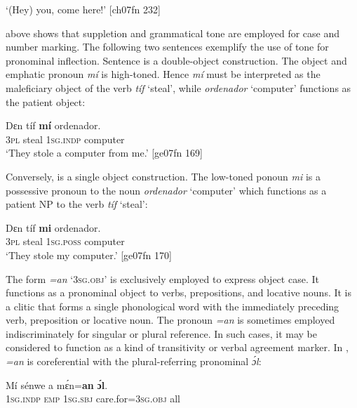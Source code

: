 \glt ‘(Hey) you, come here!’ [ch07fn 232]
\z

 above shows that suppletion and grammatical tone are employed for case and number marking. The following two sentences exemplify the use of tone for pronominal inflection. Sentence  is a double-object construction. The object and emphatic pronoun \textit{mí} is high-toned. Hence \textit{mí} must be interpreted as the maleficiary object of the verb \textit{tíf} ‘steal’, while \textit{ordenador} ‘computer’ functions as the patient object:


\ea%
    \label{ex:key:284}
    \gll Dɛn  tíf    \textbf{mí}    ordenador.\\
\textsc{3pl}  steal  \textsc{1sg.indp}  computer\\

\glt ‘They stole a computer from me.’ [ge07fn 169]
\z

Conversely,  is a single object construction. The low-toned ponoun \textit{mi} is a possessive pronoun to the noun \textit{ordenador} ‘computer’ which functions as a patient NP to the verb \textit{tíf} ‘steal’:


\ea%
    \label{ex:key:285}
    \gll Dɛn  tíf    \textbf{mi}    ordenador.\\
\textsc{3pl}  steal  \textsc{1sg.poss}  computer\\

\glt ‘They stole my computer.’ [ge07fn 170]
\z

The form \textit{=an} ‘\textsc{3sg.obj}’ is exclusively employed to express object case. It functions as a pronominal object to verbs, prepositions, and locative nouns. It is a clitic that forms a single phonological word with the immediately preceding verb, preposition or locative noun. The pronoun \textit{=an} is sometimes employed indiscriminately for singular or plural reference. In such cases, it may be considered to function as a kind of transitivity or verbal agreement marker. In , \textit{=an} is coreferential with the plural-referring pronominal \textit{ɔ́l}: 


\ea%
    \label{ex:key:286}
    \gll Mí    sénwe  a    mɛ́n=\textbf{an}      \textbf{ɔ́l}.\\
\textsc{1sg.indp}  \textsc{emp}    \textsc{1sg.sbj}  care.for=\textsc{3sg.obj}  all\\


